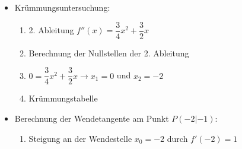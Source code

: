 \begin{itemize}
\begin{enumerate}
    \item Berechnung der Nullstellen der 1. Ableitung\\
    \item  $0 = \dfrac{1}{4} x^3 +\dfrac{3}{4} x^2 \longrightarrow x_1 =x_2 = 0$ und $x_3= -3$\\
\item Monotonietabelle:\\
\\
    \end{enumerate}
    \item Krümmungsuntersuchung:\\
    \begin{enumerate}
    \item 2. Ableitung $f''(x) = \dfrac{3}{4} x^2 + \dfrac{3}{2} x$\\
    \item Berechnung der Nullstellen der 2. Ableitung\\
    \item $0 = \dfrac{3}{4} x^2 +\dfrac{3}{2} x \longrightarrow x_1 = 0$ und $x_2= -2$\\
    \item Krümmungstabelle\\
    \end{enumerate}
    \item Berechnung der Wendetangente am Punkt $P(-2|-1)$: \\
    \begin{enumerate}
    \item Steigung an der Wendestelle $x_0 = -2$ durch $f'(-2) = 1$\\

\end{enumerate}
\end{itemize}
